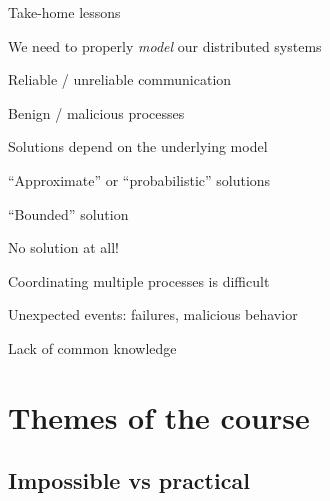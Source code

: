 \begin{frame}{Take-home lessons}
\BI
\item We need to properly \emph{model} our distributed systems
\BI
\item Reliable / unreliable communication
\item Benign / malicious processes
\EI
\bigskip
\item Solutions depend on the underlying model
\BI
\item “Approximate” or “probabilistic” solutions
\item “Bounded” solution
\item No solution at all!
\EI
\bigskip
\item Coordinating multiple processes is difficult
\BI 
\item Unexpected events: failures, malicious behavior
\item Lack of common knowledge
\EI
\EI
\end{frame}

\section{Themes of the course}

\subsection{Impossible vs practical}

